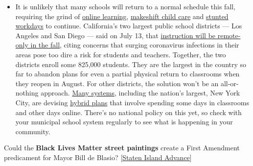 \begin{itemize}
  \begin{itemize}
  \tightlist
  \item
    It is unlikely that many schools will return to a normal schedule
    this fall, requiring the grind of
    \href{https://www.nytimes.com/2020/06/05/us/coronavirus-education-lost-learning.html?action=click\&pgtype=Article\&state=default\&region=MAIN_CONTENT_3\&context=storylines_faq}{online
    learning},
    \href{https://www.nytimes.com/2020/05/29/us/coronavirus-child-care-centers.html?action=click\&pgtype=Article\&state=default\&region=MAIN_CONTENT_3\&context=storylines_faq}{makeshift
    child care} and
    \href{https://www.nytimes.com/2020/06/03/business/economy/coronavirus-working-women.html?action=click\&pgtype=Article\&state=default\&region=MAIN_CONTENT_3\&context=storylines_faq}{stunted
    workdays} to continue. California's two largest public school
    districts --- Los Angeles and San Diego --- said on July 13, that
    \href{https://www.nytimes.com/2020/07/13/us/lausd-san-diego-school-reopening.html?action=click\&pgtype=Article\&state=default\&region=MAIN_CONTENT_3\&context=storylines_faq}{instruction
    will be remote-only in the fall}, citing concerns that surging
    coronavirus infections in their areas pose too dire a risk for
    students and teachers. Together, the two districts enroll some
    825,000 students. They are the largest in the country so far to
    abandon plans for even a partial physical return to classrooms when
    they reopen in August. For other districts, the solution won't be an
    all-or-nothing approach.
    \href{https://bioethics.jhu.edu/research-and-outreach/projects/eschool-initiative/school-policy-tracker/}{Many
    systems}, including the nation's largest, New York City, are
    devising
    \href{https://www.nytimes.com/2020/06/26/us/coronavirus-schools-reopen-fall.html?action=click\&pgtype=Article\&state=default\&region=MAIN_CONTENT_3\&context=storylines_faq}{hybrid
    plans} that involve spending some days in classrooms and other days
    online. There's no national policy on this yet, so check with your
    municipal school system regularly to see what is happening in your
    community.
  \end{itemize}
\end{itemize}

Could the \textbf{Black Lives Matter street paintings} create a First
Amendment predicament for Mayor Bill de Blasio?
{[}\href{https://www.silive.com/news/2020/08/street-murals-may-create-a-first-amendment-predicament-for-de-blasio.html}{Staten
Island Advance}{]}

